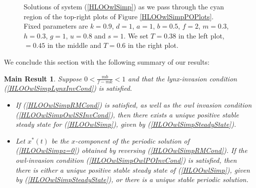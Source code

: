 \documentclass[12pt]{UOthesis}
\theoremstyle{remarkstyle}
\newtheorem{MainResult}[theo]{Main Result}
\begin{document}
\begin{figure}[h!]
	\centering
	
	\caption[Solutions of the simplified owl system (periodic orbit)]{Solutions of system (\ref{HLOOwlSimp}) as we pass through the cyan region of the top-right plots of Figure \ref{HLOOwlSimpPOPlots}. Fixed parameters are $k=0.9$, $d=1$, $a=1$, $b=0.5$, $f=2$, $m=0.3$, $h=0.3$, $g=1$, $u=0.8$ and $s=1$. We set $T=0.38$ in the left plot, $=0.45$ in the middle and $T=0.6$ in the right plot.\label{HLOOwlSimpPOCyanSolutions}}%
\end{figure}

We conclude this section with the following summary of our results:
\begin{MainResult}
	Suppose $0<\frac{mb}{f-mk}<1$ and that the lynx-invasion condition (\ref{HLOOwlSimpLynxInvCond}) is satisfied.
	\begin{itemize}
		\item[(i)] If (\ref{HLOOwlSimpRMCond}) is satisfied, as well as the owl invasion condition (\ref{HLOOwlSimpOwlSSInvCond}), then there exists a unique positive stable steady state for (\ref{HLOOwlSimp}), given by (\ref{HLOOwlSimpSteadyState}). 
		\item[(ii)] Let $x^*(t)$ be the $x$-component of the periodic solution of (\ref{HLOOwlSimpz=0}) obtained by reversing (\ref{HLOOwlSimpRMCond}). If the owl-invasion condition (\ref{HLOOwlSimpOwlPOInvCond}) is satisfied, then there is either a unique positive stable steady state of (\ref{HLOOwlSimp}), given by (\ref{HLOOwlSimpSteadyState}), or there is a unique stable periodic solution.
	\end{itemize}	
	\label{TheoHLOOwlSimpMutInvCoex}
\end{MainResult}
\end{document}
